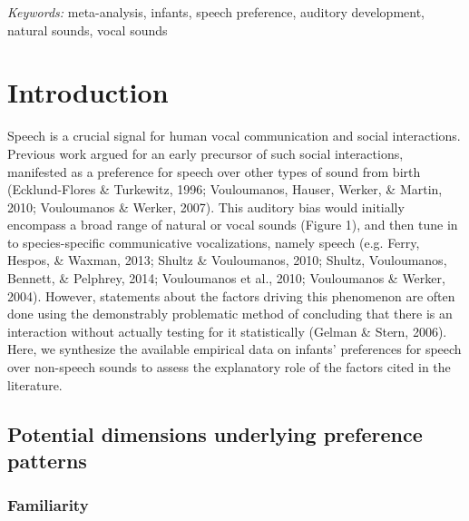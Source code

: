 \documentclass[man]{apa6}
\begin{document}
\emph{Keywords:} meta-analysis, infants, speech preference, auditory development, natural sounds, vocal sounds

\hypertarget{introduction}{%
\section{Introduction}\label{introduction}}

Speech is a crucial signal for human vocal communication and social interactions. Previous work argued for an early precursor of such social interactions, manifested as a preference for speech over other types of sound from birth (Ecklund-Flores \& Turkewitz, 1996; Vouloumanos, Hauser, Werker, \& Martin, 2010; Vouloumanos \& Werker, 2007). This auditory bias would initially encompass a broad range of natural or vocal sounds (Figure 1), and then tune in to species-specific communicative vocalizations, namely speech (e.g. Ferry, Hespos, \& Waxman, 2013; Shultz \& Vouloumanos, 2010; Shultz, Vouloumanos, Bennett, \& Pelphrey, 2014; Vouloumanos et al., 2010; Vouloumanos \& Werker, 2004). However, statements about the factors driving this phenomenon are often done using the demonstrably problematic method of concluding that there is an interaction without actually testing for it statistically (Gelman \& Stern, 2006). Here, we synthesize the available empirical data on infants' preferences for speech over non-speech sounds to assess the explanatory role of the factors cited in the literature.

\hypertarget{potential-dimensions-underlying-preference-patterns}{%
\subsection{Potential dimensions underlying preference patterns}\label{potential-dimensions-underlying-preference-patterns}}

\hypertarget{familiarity}{%
\subsubsection{Familiarity}\label{familiarity}}
\end{document}

